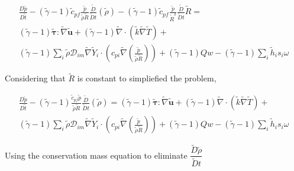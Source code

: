 \documentclass[preprint,12pt,authoryear]{elsarticle}
\begin{document}
\begin{equation}
\begin{split}
        \frac{D \tilde{p}}{D\tilde{t}}
	-
	(\tilde{\gamma}-1)
        \tilde{c}_{pf}
	\frac{ \tilde{p} }{\tilde{\rho}\tilde{R}}
        \frac{\tilde{D}}{\tilde{D} t}
	(
	\tilde{\rho}
	)
	-
	(\tilde{\gamma}-1)
        \tilde{c}_{pf}
	\frac{  \tilde{p} } {\tilde{R}^2}
        \frac{\tilde{D}}{\tilde{D} t}
	\tilde{R}
        =
	\\
	(\tilde{\gamma}-1)
        \pmb{\tilde{\tau}}:\tilde{\nabla} \tilde{\mathbf{u}} 
        + 
	(\tilde{\gamma}-1)
        \tilde{\nabla} \cdot (\tilde{k}\tilde{\nabla} \tilde{T})
        +
	\\
	(\tilde{\gamma}-1)
        \sum\limits_i 
        \tilde{\rho}
        \mathcal{D}_{im}
        \tilde{\nabla}
        \tilde{Y}_i     
        \cdot
        \left(
                c_{pi}
                \tilde{\nabla}
                \left(
                	\frac{\tilde{p}}{\tilde{\rho}\tilde{R}}
                \right)
        \right)
	+
	(\tilde{\gamma}-1)
	Qw
	-
	(\tilde{\gamma}-1)
        \sum\limits_i
	\tilde{h}_i
        s_i \omega	
\end{split}
\end{equation}


Considering that $\tilde{R}$ is constant to simpliefied the problem,

\begin{equation}
\begin{split}
        \frac{D \tilde{p}}{D\tilde{t}}
	-
	(\tilde{\gamma}-1)
	\frac{\tilde{c}_{pf} \tilde{p}   }{\tilde{\rho}\tilde{R}}
        \frac{\tilde{D}}{\tilde{D} t}
	(
	\tilde{\rho}
	)
        =
	(\tilde{\gamma}-1)
        \pmb{\tilde{\tau}}:\tilde{\nabla} \tilde{\mathbf{u}} 
        + 
	(\tilde{\gamma}-1)
        \tilde{\nabla} \cdot (\tilde{k}\tilde{\nabla} \tilde{T})
        +
	\\
	(\tilde{\gamma}-1)
        \sum\limits_i 
        \tilde{\rho}
        \mathcal{D}_{im}
        \tilde{\nabla}
        \tilde{Y}_i     
        \cdot
        \left(
                c_{pi}
                \tilde{\nabla}
                \left(
                	\frac{\tilde{p}}{\tilde{\rho}\tilde{R}}
                \right)
        \right)
	+
	(\tilde{\gamma}-1)
	Qw
	-
	(\tilde{\gamma}-1)
        \sum\limits_i
	\tilde{h}_i
        s_i \omega	
\end{split}
\end{equation}

Using the conservation mass equation 
to eliminate $\dfrac{\tilde{D}\tilde{\rho}}{\tilde{D}t}$
\end{document}
